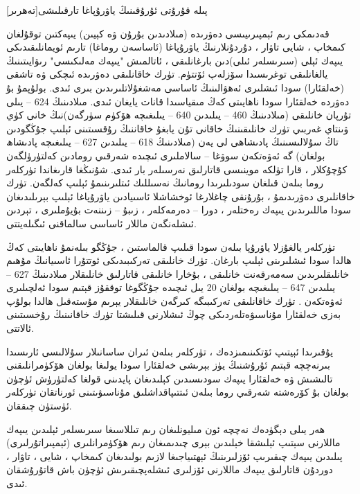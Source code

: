 \documentclass[a4paper]{article}
\begin{document}
پىلە قۇرۇتى ئۇرۇقىنىڭ ياۋرۇپاغا تارقىلىشى[تەھرىر]

قەدىمكى رىم ئېمپىرىيىسى دەۋرىدە (مىلادىدىن بۇرۇن ۋە كېيىن) يىپەكتىن توقۇلغان كىمخاپ ، شايى تاۋار ، دۇردۇنلارنىڭ ياۋرۇپاغا (ئاساسەن روماغا) تارىم ئويمانلىقىدىكى يىپەك ئېلى (سىرىسلەر ئىلى)دىن بارغانلىقى ، ئاتالمىش "يىپەك مەلىكىسى" رىۋايىتىنىڭ يالغانلىقى توغرىسىدا سۆزلەپ ئۆتتۈم. تۈرك خاقانلىقى دەۋرىدە ئىچكى ۋە تاشقى (خەلقئارا) سودا ئىشلىرى ئەھۋالىنىڭ ئاساسى مەشغۇلاتلىرىدىن بىرى ئىدى. بولۇپمۇ بۇ دەۋردە خەلقئارا سودا ناھايىتى كەڭ مىقياسىدا قانات يايغان ئىدى. مىلادىنىڭ 624 – يىلى تۇرپان خانلىقى (مىلادىنىڭ 460 – يىلىدىن 640 – يىلىغىچە ھۆكۈم سۈرگەن)نىڭ خانى كۈي ۋىنتاي غەربىي تۈرك خانلىقىنىڭ خاقانى تۇن يابغۇ خاقاننىڭ رۇقسىتىنى ئېلىپ جۇڭگودىن تاڭ سۇلالىسىنىڭ پادىشاھى لى يەن (مىلادىنىڭ 618 – يىلىدىن 627 – يىلىغىچە پادىشاھ بولغان) گە ئەۋەتكەن سوۋغا – سالاملىرى ئىچىدە شەرقىي رومادىن كەلتۈرۈلگەن كۇچۇكلار ، قارا تۈلكە موينىسى قاتارلىق نەرسىلەر بار ئىدى. شۇنىڭغا قارىغاندا تۈركلەر روما بىلەن قىلغان سودىلىرىدا رومانىڭ نەسىللىك ئىتلىرىنىمۇ ئېلىپ كەلگەن. تۈرك خاقانلىرى دەۋرىدىمۇ ، بۇرۇنقى چاغلارغا ئوخشاشلا ئاسىيادىن ياۋرۇپاغا ئېلىپ بېرىلىدىغان سودا ماللىرىدىن يىپەك رەختلەر ، دورا – دەرمەكلەر ، زىبۇ – زىننەت بۇيۇملىرى ، تېردىن ئىشلەنگەن ماللار ئاساسى سالماقنى ئىگىلەيتتى.



تۈركلەر يالغۇزلا ياۋرۇپا بىلەن سودا قىلىپ قالماستىن ، جۇڭگو بىلەنمۇ ناھايىتى كەڭ ھالدا سودا ئىشلىرىنى ئېلىپ بارغان. تۈرك خانلىقى تەركىبىدىكى ئوتتۇرا ئاسىيانىڭ مۇھىم خانلىقلىرىدىن سەمەرقەنت خانلىقى ، بۇخارا خانلىقى قاتارلىق خانلىقلار مىلادىنىڭ 627 – يىلىدىن 647 – يىلىغىچە بولغان 20 يىل ئىچىدە جۇڭگوغا توققۇز قېتىم سودا ئەلچىلىرى ئەۋەتكەن . تۈرك خاقانلىقى تەركىبىگە كىرگەن خانلىقلار يېرىم مۇستەقىل ھالدا بولۇپ بەزى خەلقئارا مۇناسىۋەتلەردىكى چوڭ ئىشلارنى قىلىشتا تۈرك خاقانىنىڭ رۇخسىتىنى ئالاتتى.



يۇقىرىدا ئېيتىپ ئۆتكىنىمىزدەك ، تۈركلەر بىلەن ئىران ساسانىلار سۇلالىسى ئارىسىدا بىرنەچچە قېتىم ئۇرۇشنىڭ يۈز بېرىشى خەلقئارا سودا يولىغا بولغان ھۆكۈمرانلىقنى تالىشىش ۋە خەلقئارا يىپەك سودىسىدىن كېلىدىغان پايدىنى قولغا كەلتۈرۈش ئۈچۈن بولغان بۇ كۆرەشتە شەرقىي روما بىلەن ئىتتىپاقداشلىق مۇناسىۋىتىنى ئورناتقان تۈركلەر ئۈستۈن چىققان.



ھەر يىلى دېگۈدەك نەچچە ئون مىليونلىغان رىم تىللاسىغا سىرىسلەر ئېلىدىن يىپەك ماللارنى سېتىپ ئېلىشقا خېلىدىن بېرى چىدىمىغان رىم ھۆكۈمرانلىرى (ئېمپىراتۇرلىرى) پىلىدىن يىپەك چىقىرىپ ئۆزلىرىنىڭ ئېھتىياجىغا لازىم بولىدىغان كىمخاپ ، شايى ، تاۋار ، دوردۇن قاتارلىق يىپەك ماللارنى ئۆزلىرى ئىشلەپچىقىرىش ئۈچۈن باش قاتۇرۇشقان ئىدى.
\end{document}
